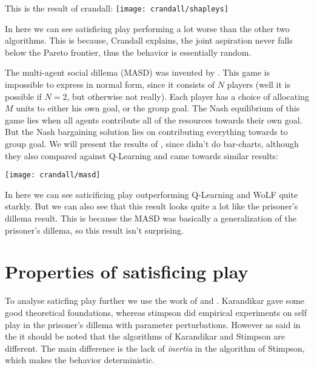 This is the result of crandall:
\texttt{[image: crandall/shapleys]}

In here we can see satisficing play performing a lot worse than the other two
algorithms. This is because, Crandall explains, the joint aspiration never
falls below the Pareto frontier, thus the behavior is essentially random.

\noindent
{}

The multi-agent social dillema (MASD) was invented by \citep{stimpson:2003}. This game
is impossible to express in normal form, since it consists of $N$ players (well
it is possible if $N=2$, but otherwise not really).
Each player has a choice of allocating $M$ units to either his own goal, 
or the group goal. The Nash equilibrium of this game lies when all agents
contribute all of the resources towards their own goal. But the Nash bargaining
solution lies on contributing everything towards to group goal. We will present
the results of \citep{crandall}, since \citep{stimpson:2003} didn't do bar-charts,
although they also compared against Q-Learning and came towards similar results:

\texttt{[image: crandall/masd]}

In here we can see saticificing play outperforming Q-Learning and WoLF quite
starkly. But we can also see that this result looks quite a lot like the
prisoner's dillema result. This is because the MASD was basically a generalization
of the prisoner's dillema, so this result isn't surprising.

\section{Properties of satisficing play}
\toReview
To analyse saticfing play further we use the work of \citep{karandikar} and
\citep{stimpson:2001}. Karandikar gave some good theoretical foundations,
whereas stimpson did empirical experiments on self play in the
prisoner's dillema with parameter perturbations. However as said in the
 it should be noted
that the algorithms of Karandikar and Stimpson are different. The main
difference is the lack of \emph{inertia} in the algorithm of Stimpson, which
makes the behavior deterministic.

